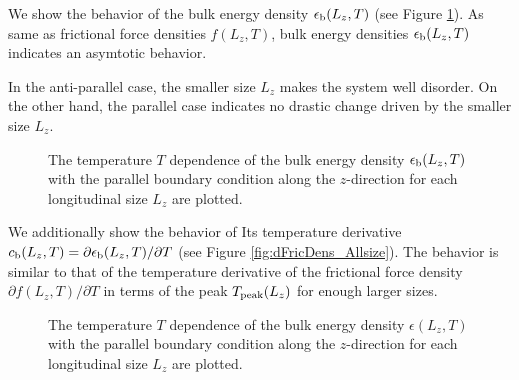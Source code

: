 We show the behavior of the bulk energy density $\epsilon_{\rm b}(L_{z}, T)$ (see Figure \ref{fig:EnDens_Allsize}). As same as frictional force densities $f(L_{z}, T)$, bulk energy densities $\epsilon_{\rm b}(L_{z}, T)$ indicates an asymtotic behavior.

In the anti-parallel case, the smaller size $L_{z}$ makes the system well disorder. On the other hand, the parallel case indicates no drastic change driven by the smaller size $L_{z}$.

\begin{figure}[htbp]
	\centering
	
	\caption{The temperature $T$ dependence of the bulk energy density $\epsilon_{\rm b}(L_{z}, T)$ with the parallel boundary condition along the $z$-direction for each longitudinal size $L_{z}$ are plotted.}
	\label{fig:EnDens_Allsize}
\end{figure}

We additionally show the behavior of Its temperature derivative $c_{\rm b}(L_{z},T)=\partial \epsilon_{\rm b}(L_{z}, T)/\partial T$ (see Figure \ref{fig:dFricDens_Allsize}). The behavior is similar to that of the temperature derivative of the frictional force density $\partial f(L_{z}, T)/\partial T$ in terms of the peak $T_{\rm peak}(L_{z})$ for enough larger sizes.

\begin{figure}[htbp]
	\centering
	
	\caption{The temperature $T$ dependence of the bulk energy density $\epsilon(L_{z}, T)$ with the parallel boundary condition along the $z$-direction for each longitudinal size $L_{z}$ are plotted.}
	\label{fig:dEnDens_Allsize}
\end{figure}
